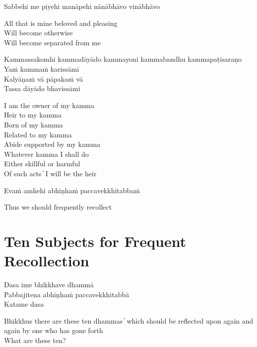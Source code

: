 Sabbehi me piyehi manāpehi nānābhāvo vinābhāvo

\begin{english}
  All that is mine beloved and pleasing\\
  Will become otherwise\\
  Will become separated from me
\end{english}

Kammassakomhi kammadāyādo kammayoni kammabandhu kammapaṭisaraṇo\\
Yaṁ kammaṁ karissāmi\\
Kalyāṇaṁ vā pāpakaṁ vā\\
Tassa dāyādo bhavissāmi

\begin{english}
  I am the owner of my kamma\\
  Heir to my kamma\\
  Born of my kamma\\
  Related to my kamma\\
  Abide supported by my kamma\\
  Whatever kamma I shall do\\
  Either skillful or harmful\\
  Of such acts  ̓  I will be the heir
\end{english}

Evaṁ amhehi abhiṇhaṁ paccavekkhitabbaṁ

\begin{english}
  Thus we should frequently recollect
\end{english}


\clearpage

\section{Ten Subjects for Frequent Recollection}

\begin{leader}
\end{leader}

Dasa ime bhikkhave dhammā\\
Pabbajitena abhiṇhaṁ paccavekkhitabbā\\
Katame dasa

\begin{english}
  Bhikkhus there are these ten dhammas  ̓  which should be reflected upon again and again by one who has gone forth\\
  What are these ten?
\end{english}

